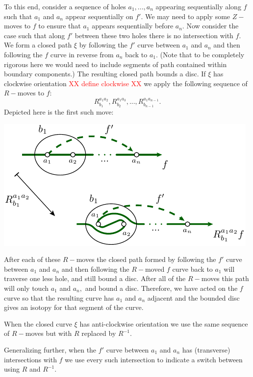 \documentclass[aps, prl, letterpaper, twocolumn, superscriptaddress, notitlepage, 10pt]{revtex4-1}
\newcommand{\simon}[1]{\textcolor{red}{#1}}
\begin{document}
To this end, consider a sequence of holes $a_1,...,a_n$
appearing sequentially along $f$
such that $a_1$ and $a_n$ appear sequentially on $f'.$
We may need to apply some $Z-$moves to $f$ to ensure
that $a_1$ appears sequentially before $a_n$.
Now consider the case such that
along $f'$ between these two holes there is
no intersection with $f.$
We form a closed path $\xi$ by
following the $f'$ curve between $a_1$ and $a_n$ and then
following the $f$ curve in reverse from $a_n$ back to $a_1.$
(Note that to be completely rigorous here we would need to include segments
of path contained within boundary components.)
The resulting closed path bounds a disc.
If $\xi$ has clockwise orientation \simon{XX define clockwise XX}
we apply the following sequence of $R-$moves to $f$:
$$
    R^{a_1a_2}_{b_1}, R^{a_1a_3}_{b_2}, ..., R^{a_1a_{n-1}}_{b_{n-1}}.
$$
Depicted here is the first such move:
\begin{center}
\includegraphics[]{pic-theorem.pdf}
\end{center}
After each of these $R-$moves the closed path
formed by 
following the $f'$ curve between $a_1$ and $a_n$ and then
following the $R-$moved $f$ curve back to $a_1$ will
traverse one less hole, and still bound a disc.
After all of the $R-$moves this path will only
touch $a_1$ and $a_n,$ and bound a disc.
Therefore, we have acted on the $f$ curve so that
the resulting curve has $a_1$ and $a_n$ adjacent
and the bounded disc gives an isotopy for that
segment of the curve.

When the closed curve $\xi$ has anti-clockwise orientation
we use the same sequence of $R-$moves but with $R$ replaced by $R^{-1}.$

Generalizing further,
when the $f'$ curve between $a_1$ and $a_n$ has (transverse) intersections
with $f$ we use every such intersection to indicate a switch
between using $R$ and $R^{-1}.$

\end{document}
